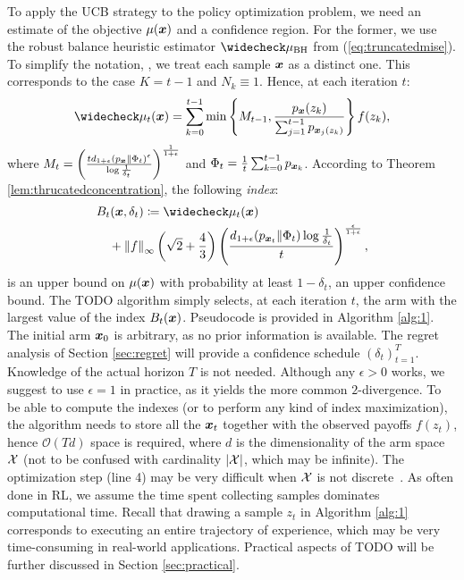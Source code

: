 \documentclass{article}
\makeatletter
\DeclareRobustCommand{\algoname}{TODO\@\xspace}
\makeatother
\begin{document}
To apply the UCB strategy to the policy optimization problem, we need an estimate of the objective $\mu(\boldsymbol{x})$ and a confidence region. 
For the former, we use the robust balance heuristic estimator $\wc{\mu}_{\text{BH}}$ from (\ref{eq:truncatedmise}). To simplify the notation, \wlg, we treat each sample $\boldsymbol{x}$ as a distinct one. This corresponds to the case $K=t-1$ and $N_k\equiv1$. Hence, at each iteration $t$:
\begin{align}
	\wc{\mu}_t(\vx) = \sum_{k=0}^{t-1}
	\min\left\{M_{t-1}, \frac{p_{\vx}(z_k)}
	{\sum_{j=1}^{t-1}p_{\vx_j(z_k)}}\right\}f(z_k),
\end{align}
where ${M_{t} = \left(\frac{td_{1+\epsilon}(p_{\boldsymbol{x}}\|\Phi_t)^{\epsilon}}{\log\frac{1}{\delta_t}}\right)^{\frac{1}{1+\epsilon}}}$ and ${\Phi_t = \frac{1}{t}\sum_{k=0}^{t-1}p_{\boldsymbol{x}_k}}$.
According to Theorem \ref{lem:thrucatedconcentration}, the following \textit{index}:
\begin{align}
	&B_t(\vx,\delta_t) \coloneqq 
	\wc{\mu}_t(\vx) \nonumber\\
	&\quad+\norm[\infty]{f}\left(\sqrt{2}+\frac{4}{3}\right)
	\left(\frac{d_{1+\epsilon}(p_{\vx_t}\|\Phi_{t})\log\frac{1}{\delta_t}}{t}\right)^{\frac{\epsilon}{1+\epsilon}},
\end{align}
is an upper bound on $\mu(\boldsymbol{x})$ with probability at least $1-\delta_t$, \ie an upper confidence bound. The \algoname algorithm simply selects, at each iteration $t$, the arm with the largest value of the index $B_t(\boldsymbol{x})$. Pseudocode is provided in Algorithm \ref{alg:1}. The initial arm $\boldsymbol{x}_0$ is arbitrary, as no prior information is available. The regret analysis of Section \ref{sec:regret} will provide a confidence schedule $(\delta_t)_{t=1}^T$. Knowledge of the actual horizon $T$ is not needed. Although any $\epsilon>0$ works, we suggest to use $\epsilon=1$ in practice, as it yields the more common $2$-\Renyi divergence. To be able to compute the indexes (or to perform any kind of index maximization), the algorithm needs to store all the $\boldsymbol{x}_t$ together with the observed payoffs $f(z_t)$, hence $\mathcal{O}(Td)$ space is required, where $d$ is the dimensionality of the arm space $\mathcal{X}$ (not to be confused with cardinality $|\mathcal{X}|$, which may be infinite). The optimization step (line 4) may be very difficult when $\mathcal{X}$ is not discrete~\citep[\cf][]{srinivas2009gaussian}. As often done in RL, we assume the time spent collecting samples dominates computational time. Recall that drawing a sample $z_t$ in Algorithm \ref{alg:1} corresponds to executing an entire trajectory of experience, which may be very time-consuming in real-world applications. Practical aspects of \algoname will be further discussed in Section \ref{sec:practical}.
\end{document}
